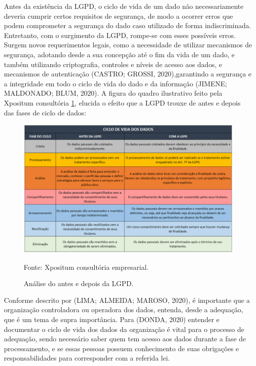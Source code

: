 \documentclass[
	12pt,				%
	openright,			%
	oneside,			%
	a4paper,			%
	english,			%
	french,				%
	spanish,			%
	brazil,				%
	]{abntex2}
\begin{document}
Antes da existência da LGPD, o ciclo de vida de um dado não necessariamente deveria cumprir certos requisitos de segurança, de modo a ocorrer erros que podem comprometer a segurança do dado caso utilizado de forma indiscriminada. Entretanto, com o surgimento da LGPD, rompe-se com esses possíveis erros. Surgem novos requerimentos legais, como a necessidade de utilizar mecanismos de segurança, adotando desde a sua concepção até o fim da vida de um dado, e também utilizando criptografia, controles e níveis de acesso aos dados, e mecanismos de autenticação (CASTRO; GROSSI, 2020),garantindo a segurança e a integridade em todo o ciclo de vida do dado e da informação (JIMENE; MALDONADO; BLUM, 2020).
A figura do quadro ilustrativo feito pela Xpositum consultória \ref{fig: 02CicloDeVida}, elucida o efeito que a LGPD trouxe de antes e depois das fases de ciclo de dados:
\begin{figure}[ht]
    \centering
    \caption{Análise do antes e depois da LGPD.}
    \includegraphics[width=6.2in]{Images/02CicloDeVida.png}
    \label{fig: 02CicloDeVida}
    
     \centering \small Fonte: Xpositum consultória empresarial.
    
\end{figure}


Conforme descrito por (LIMA; ALMEIDA; MAROSO, 2020), é importante que a organização controladora ou operadora dos dados, entenda, desde a adequação, que é um tema de supra importância. Para (DONDA, 2020) entender e documentar o ciclo de vida dos dados da organização é vital para o processo de adequação, sendo necessário saber quem tem acesso aos dados durante a fase de processamento, e se essas pessoas possuem conhecimento de suas obrigações e responsabilidades para corresponder com a referida lei.
\end{document}
